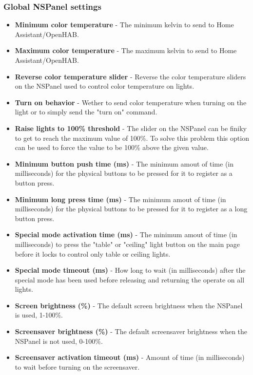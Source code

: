 \documentclass[10pt]{article}
\begin{document}
    \subsubsection{Global NSPanel settings}
    \begin{itemize}
      \item \textbf{Minimum color temperature} - The minimum kelvin to send to Home Assistant/OpenHAB.
      \item \textbf{Maximum color temperature} - The maximum kelvin to send to Home Assistant/OpenHAB.
      \item \textbf{Reverse color temperature slider} - Reverse the color temperature sliders on the NSPanel used to control color temperature on lights.
      \item \textbf{Turn on behavior} - Wether to send color temperature when turning on the light or to simply send the "turn on" command.
      \item \textbf{Raise lights to 100\% threshold} - The slider on the NSPanel can be finiky to get to reach the maximum value of 100\%. To solve this problem this option can be used to force the value to be 100\% above the given value.
      \item \textbf{Minimum button push time (ms)} - The minimum amout of time (in milliseconds) for the physical buttons to be pressed for it to register as a button press.
      \item \textbf{Minimum long press time (ms)} - The minimum amout of time (in milliseconds) for the physical buttons to be pressed for it to register as a long button press.
      \item \textbf{Special mode activation time (ms)} - The minimum amout of time (in milliseconds) to press the "table" or "ceiling" light button on the main page before it locks to control only table or ceiling lights.
      \item \textbf{Special mode timeout (ms)} - How long to wait (in milliseconds) after the special mode has been used before releasing and returning the operate on all lights.
      \item \textbf{Screen brightness (\%)} - The default screen brightness when the NSPanel is used, 1-100\%.
      \item \textbf{Screensaver brightness (\%)} - The default screensaver brightness when the NSPanel is not used, 0-100\%.
      \item \textbf{Screensaver activation timeout (ms)} - Amount of time (in milliseconds) to wait before turning on the screensaver.

\end{itemize}
\end{document}
